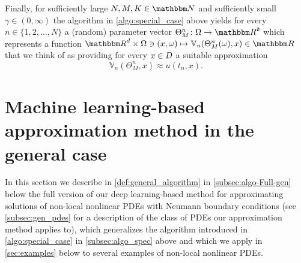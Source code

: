 Finally, for sufficiently large $N,M,K\in\N$ and sufficiently small $\gamma\in(0,\infty)$ the algorithm in \cref{algo:special_case} above yields for every $n\in\{1,2,\dots,N\}$ a (random) parameter vector $\Theta^n_M\colon \Omega\to\R^{\mathfrak d}$
which represents a function $\R^d\times\Omega\ni (x,\omega)\mapsto \mathbb V_n(\Theta^n_M(\omega),x)\in \R$ that we think of as providing for every $x\in D$ a suitable approximation
\begin{equation}
	\mathbb V_n(\Theta^n_M,x) \approx u(t_n,x)
	.
\end{equation}


\section{Machine learning-based approximation method in the general case}
\label{sec:derivation_gen}

In this section we describe in \cref{def:general_algorithm} in \cref{subsec:algo-Full-gen} below the full version of our deep learning-based method for approximating solutions of non-local nonlinear PDEs with Neumann boundary conditions (see \cref{subsec:gen_pdes} for a description of the class of PDEs our approximation method applies to), which generalizes the algorithm introduced in \cref{algo:special_case} in \cref{subsec:algo_spec} above and which we apply in \cref{sec:examples} below to several examples of non-local nonlinear PDEs.

